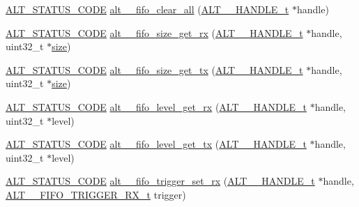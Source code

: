 \begin{DoxyCompactItemize}
\item 
\mbox{\hyperlink{hwlib_8h_abdb0d369f069723ca55d6c94bcaaaa12}{A\+L\+T\+\_\+\+S\+T\+A\+T\+U\+S\+\_\+\+C\+O\+DE}} \mbox{\hyperlink{group__UART__FIFO_gaec47f311df9de1dc2ce0a94dc88962ac}{alt\+\_\+\_\+fifo\+\_\+clear\+\_\+all}} (\mbox{\hyperlink{group__UART__BASIC_ga4173f362f19fc04032c3859b78d78119}{A\+L\+T\+\_\+\_\+\+H\+A\+N\+D\+L\+E\+\_\+t}} $\ast$handle)
\item 
\mbox{\hyperlink{hwlib_8h_abdb0d369f069723ca55d6c94bcaaaa12}{A\+L\+T\+\_\+\+S\+T\+A\+T\+U\+S\+\_\+\+C\+O\+DE}} \mbox{\hyperlink{group__UART__FIFO_ga6d581b8e4af0aa3c1f4d760b93aa76c6}{alt\+\_\+\_\+fifo\+\_\+size\+\_\+get\+\_\+rx}} (\mbox{\hyperlink{group__UART__BASIC_ga4173f362f19fc04032c3859b78d78119}{A\+L\+T\+\_\+\_\+\+H\+A\+N\+D\+L\+E\+\_\+t}} $\ast$handle, uint32\+\_\+t $\ast$\mbox{\hyperlink{sun4u_2tte_8h_a245260f6f74972558f61b85227df5aae}{size}})
\item 
\mbox{\hyperlink{hwlib_8h_abdb0d369f069723ca55d6c94bcaaaa12}{A\+L\+T\+\_\+\+S\+T\+A\+T\+U\+S\+\_\+\+C\+O\+DE}} \mbox{\hyperlink{group__UART__FIFO_ga0949ae7ab1231dcd627313844c012847}{alt\+\_\+\_\+fifo\+\_\+size\+\_\+get\+\_\+tx}} (\mbox{\hyperlink{group__UART__BASIC_ga4173f362f19fc04032c3859b78d78119}{A\+L\+T\+\_\+\_\+\+H\+A\+N\+D\+L\+E\+\_\+t}} $\ast$handle, uint32\+\_\+t $\ast$\mbox{\hyperlink{sun4u_2tte_8h_a245260f6f74972558f61b85227df5aae}{size}})
\item 
\mbox{\hyperlink{hwlib_8h_abdb0d369f069723ca55d6c94bcaaaa12}{A\+L\+T\+\_\+\+S\+T\+A\+T\+U\+S\+\_\+\+C\+O\+DE}} \mbox{\hyperlink{group__UART__FIFO_ga7aa39683a2cf11152084c2b513d9867d}{alt\+\_\+\_\+fifo\+\_\+level\+\_\+get\+\_\+rx}} (\mbox{\hyperlink{group__UART__BASIC_ga4173f362f19fc04032c3859b78d78119}{A\+L\+T\+\_\+\_\+\+H\+A\+N\+D\+L\+E\+\_\+t}} $\ast$handle, uint32\+\_\+t $\ast$level)
\item 
\mbox{\hyperlink{hwlib_8h_abdb0d369f069723ca55d6c94bcaaaa12}{A\+L\+T\+\_\+\+S\+T\+A\+T\+U\+S\+\_\+\+C\+O\+DE}} \mbox{\hyperlink{group__UART__FIFO_ga6bdd9a289734c973112756c420936ac8}{alt\+\_\+\_\+fifo\+\_\+level\+\_\+get\+\_\+tx}} (\mbox{\hyperlink{group__UART__BASIC_ga4173f362f19fc04032c3859b78d78119}{A\+L\+T\+\_\+\_\+\+H\+A\+N\+D\+L\+E\+\_\+t}} $\ast$handle, uint32\+\_\+t $\ast$level)
\item 
\mbox{\hyperlink{hwlib_8h_abdb0d369f069723ca55d6c94bcaaaa12}{A\+L\+T\+\_\+\+S\+T\+A\+T\+U\+S\+\_\+\+C\+O\+DE}} \mbox{\hyperlink{group__UART__FIFO_ga2edadfb8154ec759d6f64332cb358799}{alt\+\_\+\_\+fifo\+\_\+trigger\+\_\+set\+\_\+rx}} (\mbox{\hyperlink{group__UART__BASIC_ga4173f362f19fc04032c3859b78d78119}{A\+L\+T\+\_\+\_\+\+H\+A\+N\+D\+L\+E\+\_\+t}} $\ast$handle, \mbox{\hyperlink{group__UART__FIFO_ga6f6aa621e8111510517b92f57eb0987a}{A\+L\+T\+\_\+\_\+\+F\+I\+F\+O\+\_\+\+T\+R\+I\+G\+G\+E\+R\+\_\+\+R\+X\+\_\+t}} trigger)

\end{DoxyCompactItemize}
